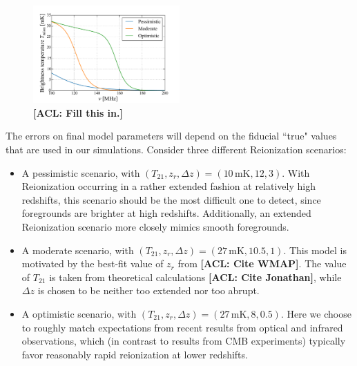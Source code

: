 \documentclass[twolcolumn,apj,iop,numberedappendix]{emulateapj}
\newcommand{\acl}[1]{{\color{red} \textbf{[ACL:  #1]}}}
\begin{document}
\begin{figure}[h]
	\centering
	\includegraphics[width=0.5\textwidth]{figures/reionScenarios.pdf}
	\caption{\acl{Fill this in.}}
	\label{fig:reionScenarios}
\end{figure}

The errors on final model parameters will depend on the fiducial ``true" values that are used in our simulations. Consider three different Reionization scenarios:
\begin{itemize}
\item A pessimistic scenario, with $(T_{21}, z_r, \Delta z) = (10\,\textrm{mK}, 12, 3) $. With Reionization occurring in a rather extended fashion at relatively high redshifts, this scenario should be the most difficult one to detect, since foregrounds are brighter at high redshifts. Additionally, an extended Reionization scenario more closely mimics smooth foregrounds.
\item A moderate scenario, with $(T_{21}, z_r, \Delta z) = (27\,\textrm{mK}, 10.5, 1) $. This model is motivated by the best-fit value of $z_r$ from \acl{Cite WMAP}. The value of $T_{21}$ is taken from theoretical calculations \acl{Cite Jonathan}, while $\Delta z$ is chosen to be neither too extended nor too abrupt.
\item A optimistic scenario, with $(T_{21}, z_r, \Delta z) = (27\,\textrm{mK}, 8, 0.5) $. Here we choose to roughly match expectations from recent results from optical and infrared observations, which (in contrast to results from CMB experiments) typically favor reasonably rapid reionization at lower redshifts.
\end{itemize}
\end{document}
